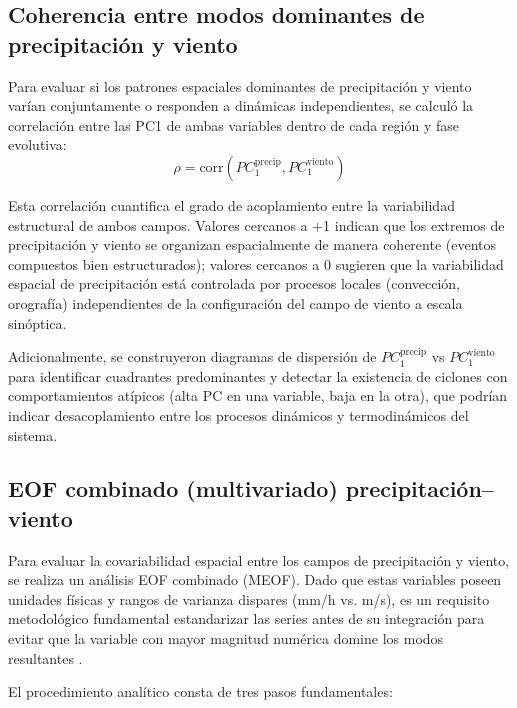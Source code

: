 \subsection{Coherencia entre modos dominantes de precipitación y viento}\label{subsubsec:coherencia_pc1}

Para evaluar si los patrones espaciales dominantes de precipitación y viento varían conjuntamente o responden a dinámicas independientes, se calculó la correlación entre las PC1 de ambas variables dentro de cada región y fase evolutiva:
\begin{equation}
    \rho = \text{corr}(PC_1^{\text{precip}}, PC_1^{\text{viento}})
\end{equation}

Esta correlación cuantifica el grado de acoplamiento entre la variabilidad estructural de ambos campos. Valores cercanos a +1 indican que los extremos de precipitación y viento se organizan espacialmente de manera coherente (eventos compuestos bien estructurados); valores cercanos a 0 sugieren que la variabilidad espacial de precipitación está controlada por procesos locales (convección, orografía) independientes de la configuración del campo de viento a escala sinóptica.

Adicionalmente, se construyeron diagramas de dispersión de $PC_1^{\text{precip}}$ vs $PC_1^{\text{viento}}$ para identificar cuadrantes predominantes y detectar la existencia de ciclones con comportamientos atípicos (alta PC en una variable, baja en la otra), que podrían indicar desacoplamiento entre los procesos dinámicos y termodinámicos del sistema.


\subsection{EOF combinado (multivariado) precipitación--viento}\label{subsec:eof_multivariado}

Para evaluar la covariabilidad espacial entre los campos de precipitación y viento, se realiza un análisis EOF combinado (MEOF). Dado que estas variables poseen unidades físicas y rangos de varianza dispares (mm/h vs. m/s), es un requisito metodológico fundamental estandarizar las series antes de su integración para evitar que la variable con mayor magnitud numérica domine los modos resultantes \citep{wilks2019statistical_ch13}. 

El procedimiento analítico consta de tres pasos fundamentales:

